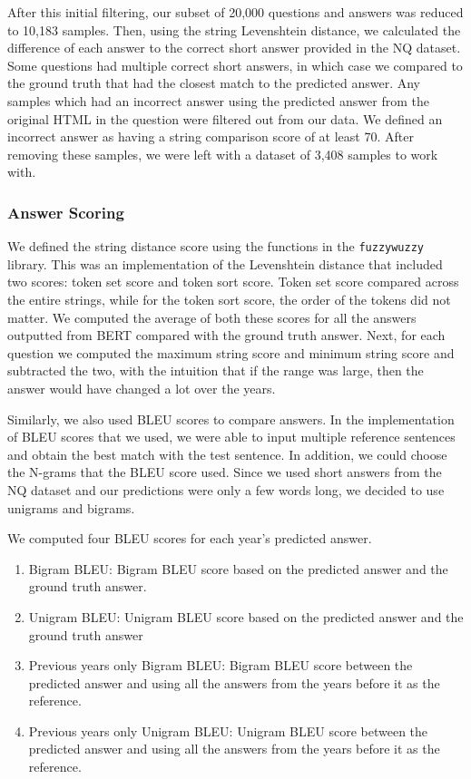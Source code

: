 \documentclass{article}
\begin{document}
After this initial filtering, our subset of 20,000 questions and answers was
reduced to 10,183 samples. Then, using the string Levenshtein distance, we
calculated the difference of each answer to the correct short answer provided in
the NQ dataset. Some questions had multiple correct short answers, in which case
we compared to the ground truth that had the closest match to the predicted
answer. Any samples which had an incorrect answer using the predicted answer
from the original HTML in the question were filtered out from our data. We
defined an incorrect answer as having a string comparison score of at least 70.
After removing these samples, we were left with a dataset of 3,408 samples to
work with.

\subsubsection{Answer Scoring}
We defined the string distance score using the functions in the {\tt fuzzywuzzy}
library. This was an implementation of the Levenshtein distance that included
two scores: token set score and token sort score. Token set score compared
across the entire strings, while for the token sort score, the order of the
tokens did not matter. We computed the average of both these scores for all the
answers outputted from BERT compared with the ground truth answer. Next, for
each question we computed the maximum string score and minimum string score and
subtracted the two, with the intuition that if the range was large, then the
answer would have changed a lot over the years.

Similarly, we also used BLEU scores to compare answers. In the implementation of
BLEU scores that we used, we were able to input multiple reference sentences and
obtain the best match with the test sentence. In addition, we could choose the
N-grams that the BLEU score used. Since we used short answers from the NQ
dataset and our predictions were only a few words long, we decided to use
unigrams and bigrams.

We computed four BLEU scores for each year’s predicted answer.
\begin{enumerate}
	\item Bigram BLEU: Bigram BLEU score based on the predicted answer and the
	      ground truth answer.
	\item Unigram BLEU: Unigram BLEU score based on the predicted answer and the
	      ground truth answer
	\item Previous years only Bigram BLEU: Bigram BLEU score between the predicted
	      answer and using all the answers from the years before it as the reference.
	\item Previous years only Unigram BLEU: Unigram BLEU score between the
	      predicted answer and using all the answers from the years before it as the
	      reference.
\end{enumerate}
\end{document}
